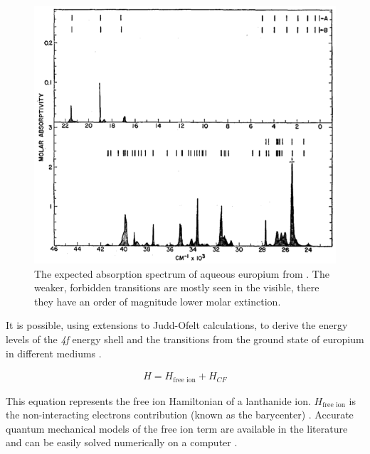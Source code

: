 \begin{figure}
\begin{center}
\includegraphics[width=\textwidth]{figures/eu_spec.png}
\end{center}
\caption{The expected absorption spectrum of aqueous europium from \cite{Carnall:1968ch}. The weaker, forbidden transitions are mostly seen in the visible, there they have an order of magnitude lower molar extinction.}
\label{fig:eu_spec_theory}
\end{figure}

It is possible, using extensions to Judd-Ofelt calculations, to derive the
energy levels of the \textsl{4f} energy shell and the transitions from the
ground state of europium in different mediums
\cite{Carnall:1968ch,Carnall:1989fc,Richardson:1989vf,vanPieterson:2002hd}.

\begin{align}
  H = H_{\text{free ion}} + H_{CF} \label{eq:lan_ham}
\end{align}


This equation represents the free ion Hamiltonian of a lanthanide ion.
$H_{\text{free ion}}$ is the non-interacting electrons contribution (known as
the barycenter) \cite{Peijzel:2005jh}. Accurate quantum mechanical models of
the free ion term are available in the literature and can be easily solved
numerically on a computer \cite{Carnall:1989fc,Morrison:1988tw}.

